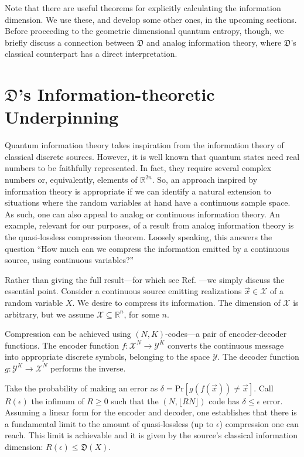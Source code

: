 \documentclass[draft,nofootinbib,pre,twocolumn,showkeys,superscriptaddress,preprintnumbers,floatfix]{revtex4-1}
\newcommand{\1}{\mathbbm{1}}
\begin{document}
Note that there are useful theorems for explicitly calculating the information
dimension. We use these, and develop some other ones, in the upcoming sections.
Before proceeding to the geometric dimensional quantum entropy, though, we
briefly discuss a connection between $\mathfrak{D}$ and analog information
theory, where $\mathfrak{D}$'s classical counterpart has a direct
interpretation.

\section{$\mathfrak{D}$'s Information-theoretic Underpinning}

Quantum information theory takes inspiration from the information theory of
classical discrete sources. However, it is well known that quantum states need
real numbers to be faithfully represented. In fact, they require several complex
numbers or, equivalently, elements of $\mathbb{R}^{2n}$. So, an approach inspired
by information theory is appropriate \cite{Cove91a} if we can identify a
natural extension to situations where the random variables at hand have a
continuous sample space. As such, one can also appeal to analog or continuous
information theory. An example, relevant for our purposes, of a result from
analog information theory is the quasi-lossless compression theorem. Loosely
speaking, this answers the question ``How much can we compress the information
emitted by a continuous source, using continuous variables?''

Rather than giving the full result---for which see Ref. \cite{Wu10}---we simply
discuss the essential point. Consider a continuous source emitting realizations
$\vec{x} \in \mathcal{X}$ of a random variable $X$. We desire to compress its
information. The dimension of $\mathcal{X}$ is arbitrary, but we assume
$\mathcal{X} \subseteq \mathbb{R}^n$, for some $n$.

Compression can be achieved using $(N,K)$-codes---a pair of encoder-decoder
functions. The encoder function $f : \mathcal{X}^N \to \mathcal{Y}^K$ converts
the continuous message into appropriate discrete symbols, belonging to the
space $\mathcal{Y}$. The decoder function $g : \mathcal{Y}^K \to
\mathcal{X}^N$ performs the inverse. 

Take the probability of making an error as $\delta = \mathrm{Pr}\left[
g(f(\vec{x})) \neq \vec{x}\right]$. Call $R(\epsilon)$ the infimum of $R \geq
0$ such that the $\left( N ,\lfloor RN\rfloor \right)$ code has $\delta \leq
\epsilon$ error. Assuming a linear form for the encoder and decoder, one
establishes that there is a fundamental limit to the amount of quasi-lossless
(up to $\epsilon$) compression one can reach. This limit is achievable and it
is given by the source's classical information dimension: $R(\epsilon)
\leq \mathfrak{D}(X)$.
\end{document}
